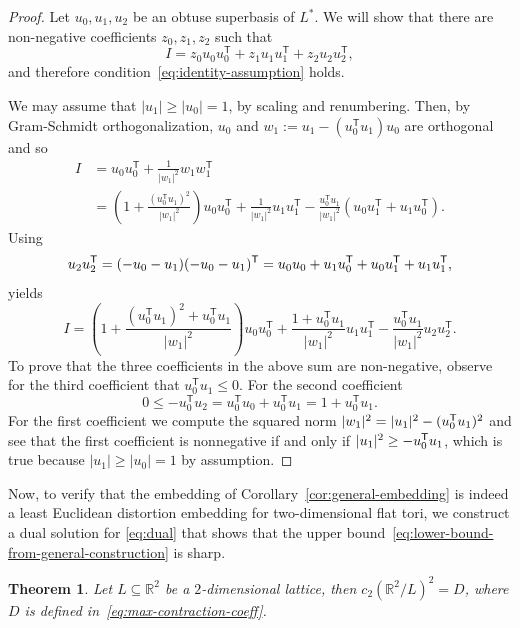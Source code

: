 \documentclass{amsart}
\newtheorem{theorem}[defin]{Theorem}
\newcommand{\R}{\mathbb{R}}
\begin{document}
\begin{proof}
  Let $u_0,u_1,u_2$ be an obtuse superbasis of $L^*$.  We will show
  that there are non-negative coefficients $z_0, z_1, z_2$ such that
 \[
   I = z_0 u_0u_0^\mathsf{T} + z_1 u_1u_1^\mathsf{T} + z_2
   u_2u_2^\mathsf{T} ,
\]
and therefore condition~\eqref{eq:identity-assumption} holds.

We may assume that $|u_1| \geq |u_0| = 1$, by
scaling and renumbering. Then, by Gram-Schmidt orthogonalization,
$u_0$ and $w_1 := u_1 - (u_0^\mathsf{T} u_1) u_0$ are orthogonal and
so
\[
\begin{split}
  I & = u_0 u_0^\mathsf{T} + \frac{1}{|w_1|^2}w_1w_1^\mathsf{T}\\
  & = \left(1+\frac{ (u_0^\mathsf{T} u_1)^2}{|w_1|^2}\right) u_0u_0^\mathsf{T} +
  \frac{1}{|w_1|^2} u_1u_1^\mathsf{T} - \frac{u_0^\mathsf{T}
    u_1}{|w_1|^2}(u_0u_1^\mathsf{T}+u_1u_0^\mathsf{T}).
\end{split}
\]
Using
\[
  u_2 u_2^{\sf T} = (-u_0 - u_1) (-u_0 - u_1)^{\sf T} = u_0 u_0 + u_1 u_0^{\sf T} + u_0
  u_1^{\sf T} + u_1 u_1^{\sf T},
\]
yields
\[
I =\left(1+\frac{ (u_0^\mathsf{T} u_1)^2 +
    u_0^\mathsf{T}u_1}{|w_1|^2}\right)u_0u_0^\mathsf{T} +\frac{1+
  u_0^\mathsf{T}u_1}{|w_1|^2}u_1u_1^\mathsf{T} - \frac{ u_0^\mathsf{T} u_1}{|w_1|^2}u_2u_2^\mathsf{T}.
\]
To prove that the three coefficients in the above sum are
non-negative, observe for the third coefficient that $u_0^\mathsf{T}u_1 \le 0
$. For the second coefficient
\[
0 \le  - u_0^\mathsf{T}u_2  = u_0^\mathsf{T}u_0 + u_0^\mathsf{T} u_1 =
1 +u_0^\mathsf{T} u_1.
\]
For the first coefficient we compute the squared norm $|w_1|^2 =
|u_1|^2 - (u_0^{\sf T} u_1)^2$ and see that the first coefficient is
nonnegative if and only if $|u_1|^2 \geq -u_0^{\sf T} u_1$, which is
true because $|u_1| \geq |u_0| = 1$ by assumption.
\end{proof}

Now, to verify that the embedding of
Corollary~\ref{cor:general-embedding} is indeed a least Euclidean
distortion embedding for two-dimensional flat tori, we construct a
dual solution for \eqref{eq:dual} that shows that the
upper bound~\eqref{eq:lower-bound-from-general-construction} is sharp.

\begin{theorem}
\label{thm:dual-solution-for-2d-case}
Let $L \subseteq \R^2$ be a $2$-dimensional lattice, then
$c_2(\R^2/L)^2 = D$, where $D$ is defined
in~\eqref{eq:max-contraction-coeff}.
\end{theorem}
\end{document}
